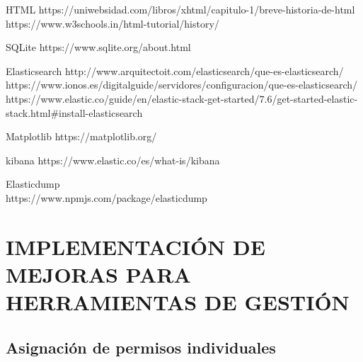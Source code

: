 \documentclass[11pt,a4paper]{book}
\begin{document}
	HTML 
	https://uniwebsidad.com/libros/xhtml/capitulo-1/breve-historia-de-html
	https://www.w3schools.in/html-tutorial/history/
	
	SQLite
	https://www.sqlite.org/about.html
	
	Elasticsearch
	http://www.arquitectoit.com/elasticsearch/que-es-elasticsearch/
	https://www.ionos.es/digitalguide/servidores/configuracion/que-es-elasticsearch/
	https://www.elastic.co/guide/en/elastic-stack-get-started/7.6/get-started-elastic-stack.html\#install-elasticsearch
	
	Matplotlib
	https://matplotlib.org/
	
	kibana
	https://www.elastic.co/es/what-is/kibana

	Elasticdump\\
	https://www.npmjs.com/package/elasticdump
	\chapter{IMPLEMENTACIÓN DE MEJORAS PARA HERRAMIENTAS DE GESTIÓN}
		\section{Asignación de permisos individuales}
\end{document}
